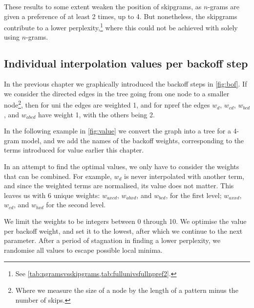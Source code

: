 These results to some extent weaken the position of skipgrams, as $n$-grams are given a preference of at least 2 times, up to 4. But nonetheless, the skipgrams contribute to a lower perplexity,\footnote{See \cref{tab:ngramsvsskipgrams,tab:fullunivsfullnpref2}.} where this could not be achieved with solely using $n$-grams.

\subsection{Individual interpolation values per backoff step}
In the previous chapter we graphically introduced the backoff steps in \cref{fig:bof}. If we consider the directed edges in the tree going from one node to a smaller node\footnote{Where we measure the size of a node by the length of a pattern minus the number of skips.}, then for \textsf{uni} the edges are weighted 1, and for \textsf{npref} the edges $w_{d}$, $w_{cd}$, $w_{bcd}$, and $w_{abcd}$ have weight 1, with the others being 2.

In the following example in \cref{fig:value} we convert the graph into a tree for a 4-gram model, and we add the names of the backoff weights, corresponding to the terms introduced for \textsf{value} earlier this chapter.

In an attempt to find the optimal values, we only have to consider the weights that can be combined. For example, $w_d$ is never interpolated with another term, and since the weighted terms are normalised, its value does not matter. This leaves us with 6 unique weights: $w_{axcd}$, $w_{abxd}$, and $w_{bcd}$, for the first level; $w_{axxd}$, $w_{cd}$, and $w_{bxd}$ for the second level.

We limit the weights to be integers between 0 through 10. We optimise the value per backoff weight, and set it to the lowest, after which we continue to the next parameter. After a period of stagnation in finding a lower perplexity, we randomise all values to escape possible local minima.



